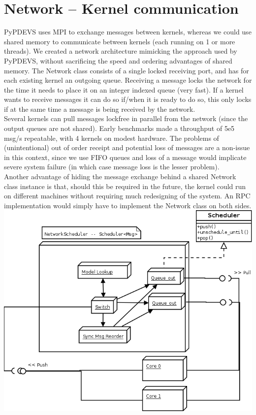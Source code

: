 \documentclass[8pt,a4paper]{report}
\begin{document}
\section{Network -- Kernel communication}
PyPDEVS uses MPI to exchange messages between kernels, whereas we could use shared memory to communicate between kernels (each running on 1 or more threads). We created a network architecture mimicking the approach used by PyPDEVS, without sacrificing the speed and ordering advantages of shared memory. The Network class consists of a single locked receiving port, and has for each existing kernel an outgoing queue. Receiving a message locks the network for the time it needs to place it on an integer indexed queue (very fast). If a kernel wants to receive messages it can do so if/when it is ready to do so, this only locks if at the same time a message is being received by the network.\\ Several kernels can pull messages lockfree in parallel from the network (since the output queues are not shared). Early benchmarks made a throughput of 5e5 msg/s repeatable, with 4 kernels on modest hardware. The problems of (unintentional) out of order receipt and potential loss of messages are a non-issue in this context, since we use FIFO queues and loss of a message would implicate severe system failure (in which case message loss is the lesser problem).\\
Another advantage of hiding the message exchange behind a shared Network class instance is that, should this be required in the future, the kernel could run on different machines without requiring much redesigning of the system. An RPC implementation would simply have to implement the Network class on both sides.
\includegraphics[scale=0.2]{network.png}
\end{document}
